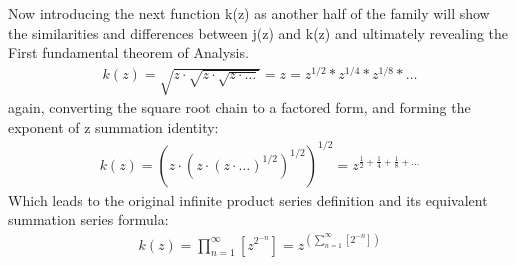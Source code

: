 \documentclass{article}
\newcommand{\sidesum}[2]{\displaystyle\sum\nolimits_{\scriptstyle #1}^{\scriptstyle #2}}
\begin{document}
Now introducing the next function k(z) as another half of the family will show the similarities and differences between j(z) and k(z) and ultimately revealing the First fundamental theorem of Analysis.
\begin{align*}
k(z) = \sqrt{z \cdot \sqrt{z \cdot \sqrt{z \cdot \ldots}}} = z = z^{1/2} * z^{1/4} * z^{1/8} * \ldots
\end{align*}
again, converting the square root chain to a factored form, and forming the exponent of z summation identity:
\begin{align*}
k(z) = \left(z \cdot \left(z \cdot \left(z \cdot \ldots\right)^{1/2}\right)^{1/2}\right)^{1/2} = z^{\frac{1}{2} + \frac{1}{4} + \frac{1}{8} + \ldots}
\end{align*}
Which leads to the original infinite product series definition and its equivalent summation series formula:
\begin{align*}
k(z) = \prod_{n=1}^{\infty} \left[z^{2^{-n}}\right] = z^{(\sidesum{n=1}{\infty}[2^{-n}])}
\end{align*}
\end{document}
